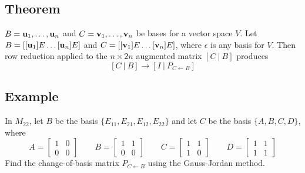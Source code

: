\subsection*{Theorem}
$B={\mathbf{u}_1,\dots,\mathbf{u}_n}$ and $C={\mathbf{v}_1,\dots,\mathbf{v}_n}$ be bases for a vector space $V$.
Let $B=[[\mathbf{u}_1]E\dots[\mathbf{u}_n]E]$ and $C=[[\mathbf{v}_1]E\dots[\mathbf{v}_n]E]$, where $\epsilon$ is any
basis for $V$. Then row reduction applied to the $n\times 2n$ augmented matrix $[C\:|\:B]$ produces
\[[C\:|\:B]\to[I\:|\:P_{C\leftarrow B}]\]

\subsection*{Example}
In $M_{22}$, let $B$ be the basis $\{E_{11}, E_{21}, E_{12}, E_{22}\}$ and let $C$
be the basis $\{A, B, C, D\}$, where
\[A=\begin{bmatrix}
        1 & 0 \\
        0 & 0
    \end{bmatrix}\qquad B=\begin{bmatrix}
        1 & 1 \\
        0 & 0
    \end{bmatrix}\qquad C=\begin{bmatrix}
        1 & 1 \\
        1 & 0
    \end{bmatrix}\qquad D=\begin{bmatrix}
        1 & 1 \\
        1 & 1
    \end{bmatrix}\]
Find the change-of-basis matrix $P_{C\leftarrow B}$ using the Gauss-Jordan method.

